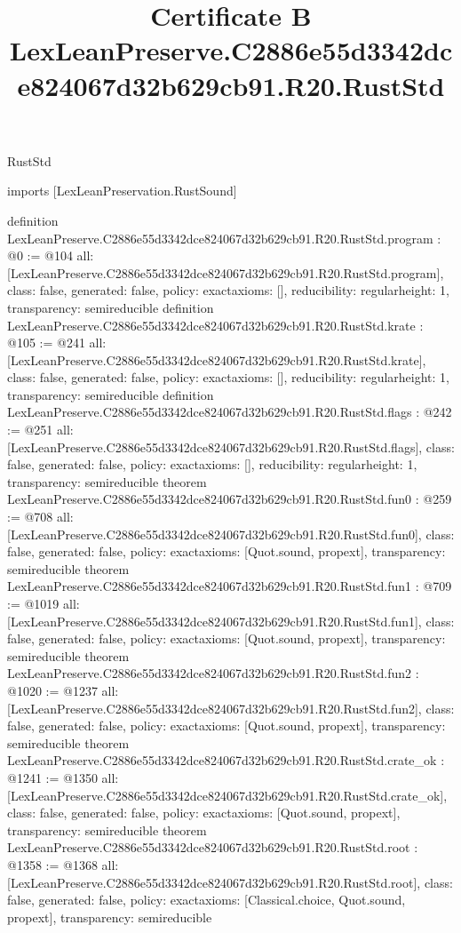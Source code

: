 \begin{lexlean}{RustStd}
\title{Certificate B LexLeanPreserve.C2886e55d3342dce824067d32b629cb91.R20.RustStd}
\begin{coremodule}
imports [LexLeanPreservation.RustSound]

definition LexLeanPreserve.C2886e55d3342dce824067d32b629cb91.R20.RustStd.program : @0 := @104 {
  all: [LexLeanPreserve.C2886e55d3342dce824067d32b629cb91.R20.RustStd.program],
  class: false,
  generated: false,
  policy: exact{axioms: []},
  reducibility: regular{height: 1},
  transparency: semireducible
}
definition LexLeanPreserve.C2886e55d3342dce824067d32b629cb91.R20.RustStd.krate : @105 := @241 {
  all: [LexLeanPreserve.C2886e55d3342dce824067d32b629cb91.R20.RustStd.krate],
  class: false,
  generated: false,
  policy: exact{axioms: []},
  reducibility: regular{height: 1},
  transparency: semireducible
}
definition LexLeanPreserve.C2886e55d3342dce824067d32b629cb91.R20.RustStd.flags : @242 := @251 {
  all: [LexLeanPreserve.C2886e55d3342dce824067d32b629cb91.R20.RustStd.flags],
  class: false,
  generated: false,
  policy: exact{axioms: []},
  reducibility: regular{height: 1},
  transparency: semireducible
}
theorem LexLeanPreserve.C2886e55d3342dce824067d32b629cb91.R20.RustStd.fun0 : @259 := @708 {
  all: [LexLeanPreserve.C2886e55d3342dce824067d32b629cb91.R20.RustStd.fun0],
  class: false,
  generated: false,
  policy: exact{axioms: [Quot.sound, propext]},
  transparency: semireducible
}
theorem LexLeanPreserve.C2886e55d3342dce824067d32b629cb91.R20.RustStd.fun1 : @709 := @1019 {
  all: [LexLeanPreserve.C2886e55d3342dce824067d32b629cb91.R20.RustStd.fun1],
  class: false,
  generated: false,
  policy: exact{axioms: [Quot.sound, propext]},
  transparency: semireducible
}
theorem LexLeanPreserve.C2886e55d3342dce824067d32b629cb91.R20.RustStd.fun2 : @1020 := @1237 {
  all: [LexLeanPreserve.C2886e55d3342dce824067d32b629cb91.R20.RustStd.fun2],
  class: false,
  generated: false,
  policy: exact{axioms: [Quot.sound, propext]},
  transparency: semireducible
}
theorem LexLeanPreserve.C2886e55d3342dce824067d32b629cb91.R20.RustStd.crate_ok : @1241 := @1350 {
  all: [LexLeanPreserve.C2886e55d3342dce824067d32b629cb91.R20.RustStd.crate_ok],
  class: false,
  generated: false,
  policy: exact{axioms: [Quot.sound, propext]},
  transparency: semireducible
}
theorem LexLeanPreserve.C2886e55d3342dce824067d32b629cb91.R20.RustStd.root : @1358 := @1368 {
  all: [LexLeanPreserve.C2886e55d3342dce824067d32b629cb91.R20.RustStd.root],
  class: false,
  generated: false,
  policy: exact{axioms: [Classical.choice, Quot.sound, propext]},
  transparency: semireducible
}


\end{coremodule}
\end{lexlean}
